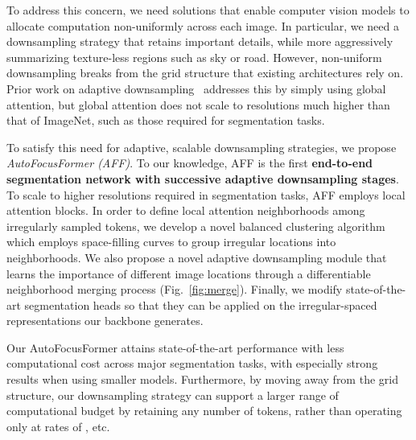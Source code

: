 \documentclass[10pt,twocolumn,letterpaper]{article}
\begin{document}
To address this concern, we need solutions that enable computer vision models to allocate computation non-uniformly across each image. In particular, we need a downsampling strategy that retains important details, while more aggressively summarizing texture-less regions such as sky or road. However, non-uniform downsampling breaks from the grid structure that existing architectures rely on. Prior work on adaptive downsampling~\cite{dynamicvit,notall,adaptivetoken} addresses this by simply using global attention, but global attention does not scale to resolutions much higher than that of ImageNet, such as those required for segmentation tasks.




To satisfy this need for adaptive, scalable downsampling strategies, we propose \textit{AutoFocusFormer (AFF)}. To our knowledge, AFF is the first \textbf{end-to-end segmentation network with successive adaptive downsampling stages}. To scale to higher resolutions required in segmentation tasks, AFF employs local attention blocks. In order to define local attention neighborhoods among irregularly sampled tokens, we develop a novel balanced clustering algorithm which employs space-filling curves to group irregular locations into neighborhoods. We also propose a novel adaptive downsampling module that learns the importance of different image locations through a differentiable neighborhood merging process (Fig.~\ref{fig:merge}). Finally, we modify state-of-the-art segmentation heads so that they can be applied on the irregular-spaced representations our backbone generates.



Our AutoFocusFormer attains state-of-the-art performance with less computational cost across major segmentation tasks, with especially strong results when using smaller models. Furthermore, by moving away from the grid structure, our downsampling strategy can support a larger range of computational budget by retaining any number of tokens, rather than operating only at rates of ,  etc.
\end{document}
